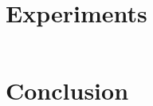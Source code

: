 \documentclass[a4paper,10pt,english]{scrartcl}
\begin{document}
\section{Experiments}


\begin{lstlisting}

\end{lstlisting}


\section{Conclusion}


\appendix


\makeatletter
\def\url@leostyle{%
  \@ifundefined{selectfont}{\def\UrlFont{\sf}}{\def\UrlFont{\small\ttfamily}}}
\makeatother



\end{document}
